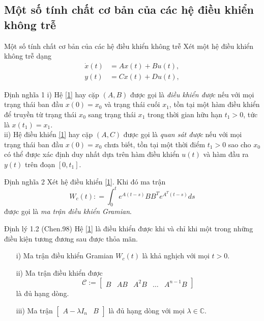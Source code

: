 \documentclass[10pt,notheorems]{beamer}
\theoremstyle{definition}
\theoremstyle{definition}
\theoremstyle{definition}
\def\lb{\lambda}
\newcommand{\m}[1]{
	\begin{bmatrix}
		#1
\end{bmatrix}}
\def\cC{\mathcal{C}}
\begin{document}
\subsection{Một số tính chất cơ bản của các hệ điều khiển không trễ}

\begin{frame}{Một số tính chất cơ bản của các hệ điều khiển không trễ}
Xét một hệ điều khiển không trễ dạng
%
\begin{equation}\label{1}
\begin{split}
\dot{x}(t) &= Ax(t)+Bu(t), \\
y(t) &= Cx(t) + Du(t),
\end{split}
\end{equation}
\begin{block}{Định nghĩa 1}
	i) Hệ \eqref{1} hay cặp $(A,B)$ được gọi là \emph{điều khiển được} nếu với mọi trạng thái ban đầu $x(0)=x_0$ và trạng thái cuối $x_1$, tồn tại một hàm điều khiển để truyền từ trạng thái $x_0$ sang trạng thái $x_1$ trong thời gian hữu hạn $t_1>0$, tức là $x(t_1) = x_1$. \\
	ii) Hệ điều khiển \eqref{1} hay cặp $(A,C)$ được gọi là \emph{quan sát được} nếu với mọi trạng thái ban đầu $x(0)=x_0$ chưa biết, tồn tại một thời điểm $t_1 > 0$ sao cho $x_0$ có thể được xác định duy nhất dựa trên hàm điều khiển $u(t)$ và hàm đầu ra $y(t)$ trên đoạn $[0,t_1]$. 
\end{block}	
\end{frame}




\begin{frame}{}
\begin{block}{Định nghĩa 2} Xét hệ điều khiển \eqref{1}. Khi đó  ma trận 
	\[
	W_c(t) : = \int_{0}^{t} e^{A(t-s)} B B^T e^{A^T (t-s)}ds
	\]
được gọi là \emph{ma trận điều khiển Gramian}.
\end{block}

\begin{block}{Định lý 1.2 (Chen.98)}
	Hệ \eqref{1} là điều khiển được khi và chỉ khi một trong những điều kiện tương đương sau được thỏa mãn.
	\begin{enumerate}
		\item[i)] Ma trận điều khiển Gramian $W_c(t)$ là khả nghịch với mọi $t>0$. 
		\item[ii)] Ma trận điều khiển được
		\[
		\cC := \m{B & AB & A^2B & \dots & A^{n-1} B}
		\]
		là đủ hạng dòng.
		\item[iii)] Ma trận $\m{A-\lb I_n & B}$ là đủ hạng dòng với mọi $\lb \in \mathbb{C}$.
	\end{enumerate}
\end{block}	
\end{frame}
\end{document}
